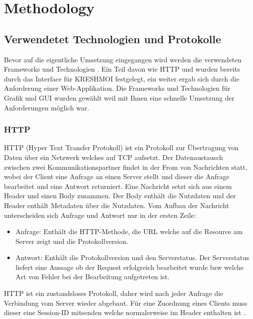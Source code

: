 
\section{Methodology}
\label{sec:methodology}

\subsection{Verwendetet Technologien und Protokolle}
\label{sec:Verwendetet Technologien}
Bevor auf die eigentliche Umsetzung eingegangen wird werden  die verwendeten Frameworks und Technologien .
Ein Teil davon\R{,} wie HTTP und  wurden bereits durch das Interface für KRESHMOI festgelegt, ein weiter ergab sich durch die Anforderung einer Web-Applikation.
Die Frameworks und Technologien für Grafik und GUI wurden gewählt weil mit Ihnen  eine schnelle Umsetzung der Anforderungen möglich war.

\subsubsection{HTTP}
\label{sec:HTTP}
HTTP (Hyper Text Transfer Protokoll) ist ein Protokoll zur Übertragung von Daten über ein Netzwerk welches auf TCP aufsetzt.
Der Datenaustausch zwischen zwei Kommunikationspartner findet in der From von Nachrichten statt, 
wobei der Client eine Anfrage an einen Server stellt und dieser die Anfrage bearbeitet und eine Antwort returniert.
%
Eine Nachricht setzt sich aus einem Header und einen Body zusammen.
Der Body enthält die Nutzdaten und der Header enthält Metadaten über die Nutzdaten.
Vom Aufbau der Nachricht unterscheiden sich Anfrage und Antwort nur in der ersten Zeile:
\begin{itemize}
	\item Anfrage: Enthält die HTTP-Methode, die URL welche auf die Resource am Server zeigt und die Protokollversion.
	\item Antwort: Enthält die Protokollversion und den Serverstatus. 
		Der Serverstatus liefert eine Aussage ob der Request erfolgreich bearbeitet wurde bzw welche Art von Fehler bei der Bearbeitung aufgetreten ist.
\end{itemize}
HTTP ist ein zustandsloses Protokoll, daher wird nach jeder Anfrage die Verbindung vom Server wieder abgebaut.
Für eine Zuordnung eines Clients muss dieser eine Session-ID mitsenden welche normalerweise im Header enthalten ist \cite{http}.

